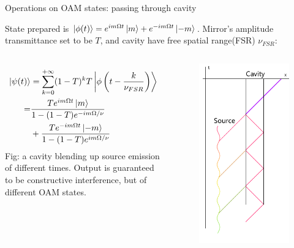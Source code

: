 \documentclass[amssymb, amsmath]{beamer}
\begin{document}
\begin{frame}{Operations on OAM states: passing through cavity}
    
    State prepared is $\ket{\phi(t)}=e^{i m\Omega t}\ket{m}+e^{-i m\Omega t}\ket{-m}$. Mirror's amplitude transmittance set to be $T$, and cavity have free spatial range(FSR) $\nu_{FSR}$: 
\begin{columns}
\begin{align}
\label{eq:psiorig}
    \ket{\psi(t)} &= \sum_{k=0}^{+\infty} (1-T)^k T \Ket{\phi\left(t-\frac{k}{\nu_{FSR}}\right)} \nonumber \\
    =& \frac{T e^{i m \Omega t} \ket{m}}{1-(1-T)e^{-i m \Omega / \nu}} \nonumber \\ 
    &+ \frac{T e^{-i m \Omega t} \ket{-m}}{1-(1-T)e^{i m \Omega / \nu}} 
\end{align}
Fig: a cavity blending up source emission of different times. Output is guaranteed to be constructive interference, but of different OAM states.

\begin{figure}
    \centering
    \includegraphics[width=0.80\columnwidth]{fig/cav_blend.png}
\end{figure}
\end{columns}
    
\end{frame}
\end{document}
